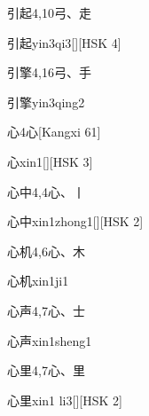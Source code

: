 \begin{entry}{引起}{4,10}{⼸、⾛}
  \begin{phonetics}{引起}{yin3qi3}[][HSK 4]
  \end{phonetics}
\end{entry}

\begin{entry}{引擎}{4,16}{⼸、⼿}
  \begin{phonetics}{引擎}{yin3qing2}
  \end{phonetics}
\end{entry}

\begin{entry}{心}{4}{⼼}[Kangxi 61]
  \begin{phonetics}{心}{xin1}[][HSK 3]
  \end{phonetics}
\end{entry}

\begin{entry}{心中}{4,4}{⼼、⼁}
  \begin{phonetics}{心中}{xin1zhong1}[][HSK 2]
  \end{phonetics}
\end{entry}

\begin{entry}{心机}{4,6}{⼼、⽊}
  \begin{phonetics}{心机}{xin1ji1}
  \end{phonetics}
\end{entry}

\begin{entry}{心声}{4,7}{⼼、⼠}
  \begin{phonetics}{心声}{xin1sheng1}
  \end{phonetics}
\end{entry}

\begin{entry}{心里}{4,7}{⼼、⾥}
  \begin{phonetics}{心里}{xin1 li3}[][HSK 2]
  \end{phonetics}
\end{entry}

